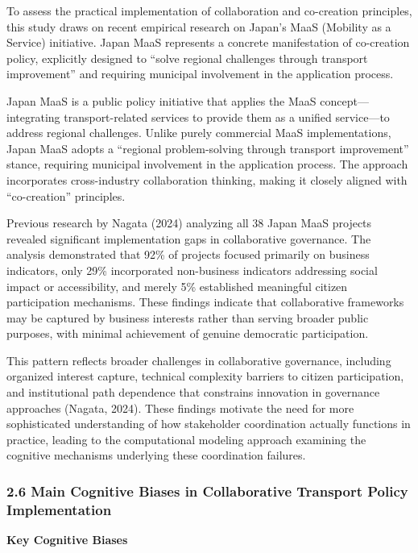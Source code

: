 To assess the practical implementation of collaboration and co-creation principles, this study draws on recent empirical research on Japan's MaaS (Mobility as a Service) initiative. Japan MaaS represents a concrete manifestation of co-creation policy, explicitly designed to ``solve regional challenges through transport improvement'' and requiring municipal involvement in the application process.

Japan MaaS is a public policy initiative that applies the MaaS concept---integrating transport-related services to provide them as a unified service---to address regional challenges. Unlike purely commercial MaaS implementations, Japan MaaS adopts a ``regional problem-solving through transport improvement'' stance, requiring municipal involvement in the application process. The approach incorporates cross-industry collaboration thinking, making it closely aligned with ``co-creation'' principles.

Previous research by Nagata (2024) analyzing all 38 Japan MaaS projects revealed significant implementation gaps in collaborative governance. The analysis demonstrated that 92\% of projects focused primarily on business indicators, only 29\% incorporated non-business indicators addressing social impact or accessibility, and merely 5\% established meaningful citizen participation mechanisms. These findings indicate that collaborative frameworks may be captured by business interests rather than serving broader public purposes, with minimal achievement of genuine democratic participation.

This pattern reflects broader challenges in collaborative governance, including organized interest capture, technical complexity barriers to citizen participation, and institutional path dependence that constrains innovation in governance approaches (Nagata, 2024). These findings motivate the need for more sophisticated understanding of how stakeholder coordination actually functions in practice, leading to the computational modeling approach examining the cognitive mechanisms underlying these coordination failures.

\subsubsection{2.6 Main Cognitive Biases in Collaborative Transport Policy Implementation}\label{main-cognitive-biases-in-collaborative-transport-policy-implementation}

\textbf{Key Cognitive Biases}

